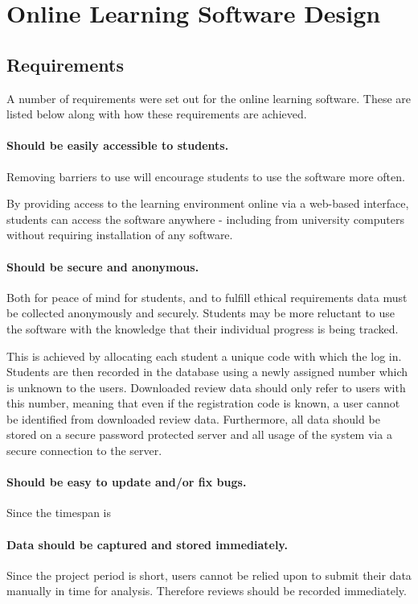 \section{Online Learning Software Design}
\label{methods_softwaredesign}
\subsection{Requirements}

A number of requirements were set out for the online learning software. These are listed below along
with how these requirements are achieved.

\paragraph{Should be easily accessible to students.} Removing barriers to use will
encourage students to use the software more often. %

By providing access to the learning environment online via a web-based interface, students can
access the software anywhere - including from university computers without requiring installation
of any software.

\paragraph{Should be secure and anonymous.} Both for peace of mind for students, and to fulfill
ethical requirements data must be collected anonymously and securely. Students may be more
reluctant to use the software with the knowledge that their individual progress is being tracked. %

This is achieved by allocating each student a unique code with which the log in. Students are then
recorded in the database using a newly assigned number which is unknown to the users. Downloaded review
data should only refer to users with this number, meaning that even if the registration code is known,
a user cannot be identified from downloaded review data. Furthermore, all data should be stored on a secure
password protected server and all usage of the system via a secure connection to the server.

\paragraph{Should be easy to update and/or fix bugs.} Since the timespan is 

\paragraph{Data should be captured and stored immediately.} Since the project period is short,
users cannot be relied upon to submit their data manually in time for analysis. Therefore reviews
should be recorded immediately.

